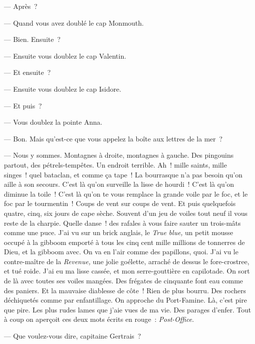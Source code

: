 \documentclass[french,twoside]{book} %
\begin{document}
— Après ?\par
 — Quand vous avez doublé le cap Monmouth.\par
— Bien. Ensuite ?\par
— Ensuite vous doublez le cap Valentin.\par
— Et ensuite ?\par
— Ensuite vous doublez le cap Isidore.\par
— Et puis ?\par
— Vous doublez la pointe Anna.\par
— Bon. Mais qu’est-ce que vous appelez la boîte aux lettres de la mer ?\par
— Nous y sommes. Montagnes à droite, montagnes à gauche. Des pingouins partout, des pétrels-tempêtes. Un endroit terrible. Ah ! mille saints, mille singes ! quel bataclan, et comme ça tape ! La bourrasque n’a pas besoin qu’on aille à son secours. C’est là qu’on surveille la lisse de hourdi ! C’est là qu’on diminue la toile ! C’est là qu’on te vous remplace la grande voile par le foc, et le foc par le tourmentin ! Coups de vent sur coups de vent. Et puis quelquefois quatre, cinq, six jours de cape sèche. Souvent d’un jeu de voiles tout neuf il vous reste de la charpie. Quelle danse ! des rafales à vous faire sauter un trois-mâts comme une puce. J’ai vu sur un brick anglais, le \emph{True blue,} un petit mousse occupé à la gibboom emporté à tous les cinq cent mille millions de tonnerres de Dieu, et la gibboom avec. On va en l’air comme des papillons, quoi. J’ai vu le contre-maître de la \emph{Revenue,} une jolie goélette, arraché de dessus le fore-crostree, et tué roide. J’ai eu ma lisse cassée, et mon serre-gouttière en capilotade. On sort de là avec toutes ses voiles mangées. Des frégates de cinquante font eau comme des paniers. Et la  mauvaise diablesse de côte ! Rien de plus bourru. Des rochers déchiquetés comme par enfantillage. On approche du Port-Famine. Là, c’est pire que pire. Les plus rudes lames que j’aie vues de ma vie. Des parages d’enfer. Tout à coup on aperçoit ces deux mots écrits en rouge : \emph{Post-Office.}\par
— Que voulez-vous dire, capitaine Gertrais ?\par
\end{document}

